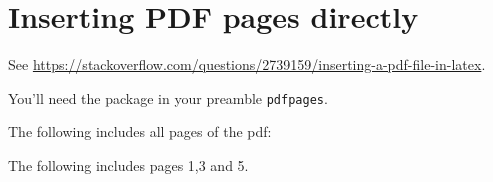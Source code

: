 \section{Inserting PDF pages directly}

See \url{https://stackoverflow.com/questions/2739159/inserting-a-pdf-file-in-latex}.

You'll need the package in your preamble \verb+pdfpages+. 

The following includes all pages of the pdf:



The following includes pages 1,3 and 5.
